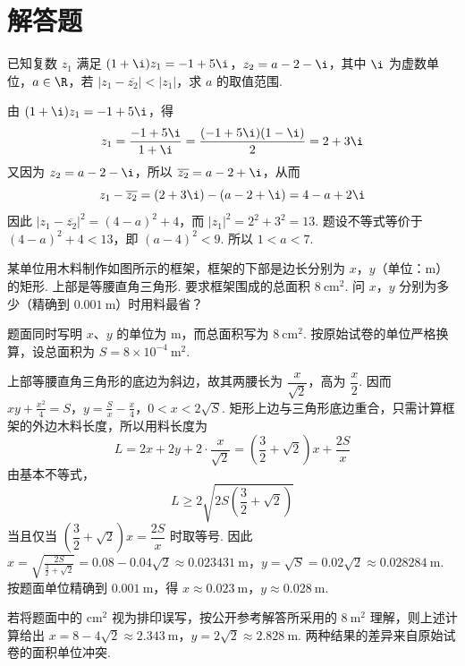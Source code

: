 \section{解答题}
\begin{problem}
已知复数 \(z_{1}\) 满足 \((1 + \i)z_{1} = -1 + 5\i\)，\(z_{2} = a - 2 - \i\)，其中 \(\i\) 为虚数单位，\(a \in \R\)，若 \(\left|z_{1} - \overline{z_{2}}\right| < |z_{1}|\)，求 \(a\) 的取值范围.
\end{problem}

\begin{solution}
由 \((1+\i)z_{1}=-1+5\i\)，得
\[
z_{1}=\frac{-1+5\i}{1+\i}=\frac{(-1+5\i)(1-\i)}{2}=2+3\i
\]
又因为 \(z_{2}=a-2-\i\)，所以 \(\overline{z_{2}}=a-2+\i\)，从而
\[
z_{1}-\overline{z_{2}}=(2+3\i)-(a-2+\i)=4-a+2\i
\]
因此 \(\left|z_{1}-\overline{z_{2}}\right|^{2}=(4-a)^{2}+4\)，而 \(|z_{1}|^{2}=2^{2}+3^{2}=13\). 题设不等式等价于 \((4-a)^{2}+4<13\)，即 \((a-4)^{2}<9\). 所以 \(1<a<7\).
\end{solution}

\begin{problem}
某单位用木料制作如图所示的框架，框架的下部是边长分别为 \(x\)，\(y\)（单位：\(\mathrm{m}\)）的矩形. 上部是等腰直角三角形. 要求框架围成的总面积 \(8 \mathrm{~cm}^{2}\). 问 \(x\)，\(y\) 分别为多少（精确到 \(0.001 \mathrm{~m}\)）时用料最省？

\end{problem}

\begin{solution}
题面同时写明 \(x\)、\(y\) 的单位为 \(\mathrm{m}\)，而总面积写为 \(8\mathrm{~cm}^{2}\). 按原始试卷的单位严格换算，设总面积为 \(S=8\times10^{-4}\mathrm{~m}^{2}\).

上部等腰直角三角形的底边为斜边，故其两腰长为 \(\dfrac{x}{\sqrt{2}}\)，高为 \(\dfrac{x}{2}\). 因而
\(xy+\frac{x^{2}}{4}=S\)，\(y=\frac{S}{x}-\frac{x}{4}\)，\(0<x<2\sqrt{S}\).
矩形上边与三角形底边重合，只需计算框架的外边木料长度，所以用料长度为
\[
L=2x+2y+2\cdot\frac{x}{\sqrt{2}}=\left(\frac{3}{2}+\sqrt{2}\right)x+\frac{2S}{x}
\]
由基本不等式，
\[
L\geqslant2\sqrt{2S\left(\frac{3}{2}+\sqrt{2}\right)}
\]
当且仅当 \(\left(\dfrac{3}{2}+\sqrt{2}\right)x=\dfrac{2S}{x}\) 时取等号. 因此
\(x=\sqrt{\frac{2S}{\frac{3}{2}+\sqrt{2}}}=0.08-0.04\sqrt{2}\approx0.023431\mathrm{~m}\)，\(y=\sqrt{S}=0.02\sqrt{2}\approx0.028284\mathrm{~m}\).
按题面单位精确到 \(0.001\mathrm{~m}\)，得 \(x\approx0.023\mathrm{~m}\)，\(y\approx0.028\mathrm{~m}\).

若将题面中的 \(\mathrm{cm}^{2}\) 视为排印误写，按公开参考解答所采用的 \(8\mathrm{~m}^{2}\) 理解，则上述计算给出 \(x=8-4\sqrt{2}\approx2.343\mathrm{~m}\)，\(y=2\sqrt{2}\approx2.828\mathrm{~m}\). 两种结果的差异来自原始试卷的面积单位冲突.
\end{solution}

